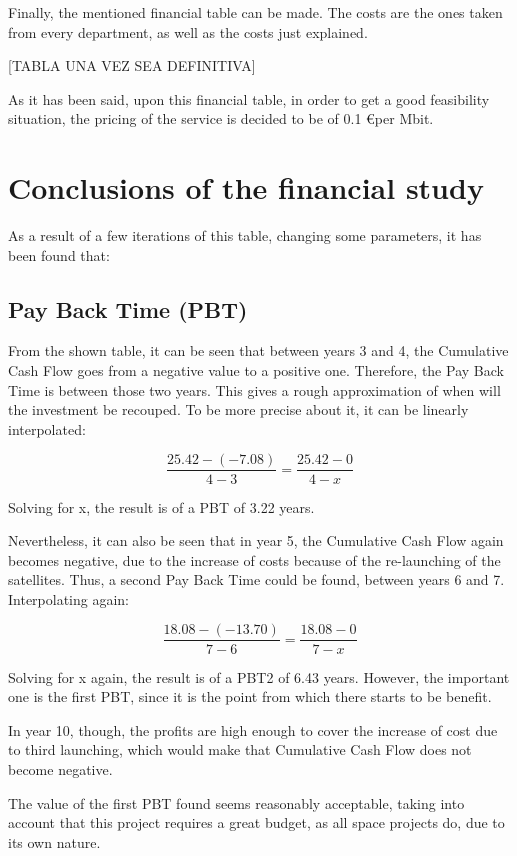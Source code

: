 Finally, the mentioned financial table can be made. The costs are the ones taken from every department, as well as the costs just explained.


[TABLA UNA VEZ SEA DEFINITIVA]

As it has been said, upon this financial table, in order to get a good feasibility situation, the pricing of the service is decided to be of 0.1 \euro  per Mbit. 

\section{Conclusions of the financial study}
As a result of a few iterations of this table, changing some parameters, it has been found that:

\subsection{Pay Back Time (PBT)}
From the shown table, it can be seen that between years 3 and 4, the Cumulative Cash Flow goes from a negative value to a positive one. Therefore, the Pay Back Time is between those two years. This gives a rough approximation of when will the investment be recouped. To be more precise about it, it can be linearly interpolated:

\begin{equation}
\frac{25.42-(-7.08)}{4-3}=\frac{25.42-0}{4-x}
\end{equation}

Solving for x, the result is of a PBT of 3.22 years.

Nevertheless, it can also be seen that in year 5, the Cumulative Cash Flow again becomes negative, due to the increase of costs because of the re-launching of the satellites. Thus, a second Pay Back Time could be found, between years 6 and 7. Interpolating again:

\begin{equation}
\frac{18.08-(-13.70)}{7-6}=\frac{18.08-0}{7-x}
\end{equation}

Solving for x again, the result is of a PBT2 of 6.43 years. However, the important one is the first PBT, since it is the point from which there starts to be benefit. 

In year 10, though, the profits are high enough to cover the increase of cost due to third launching, which would make that Cumulative Cash Flow does not become negative. 

The value of the first PBT found seems reasonably acceptable, taking into account that this project requires a great budget, as all space projects do, due to its own nature. 


